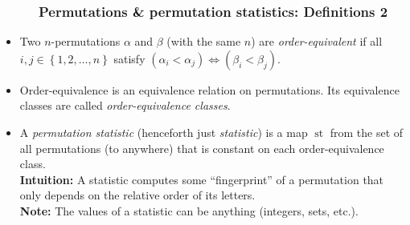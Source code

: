 \documentclass{beamer}
\newcommand{\st}{\operatorname{st}}
\newcommand{\fti}[1]{\frametitle{\ \ \ \ \ #1}}
\newcommand{\set}[1]{\left\{ #1 \right\}}
\newcommand{\tup}[1]{\left( #1 \right)}
\newcommand{\defn}[1]{{\color{darkred}\emph{#1}}} %
\theoremstyle{plain}
\begin{document}
\begin{frame}
\fti{Permutations \& permutation statistics: Definitions 2}

\begin{itemize}

\item Two $n$-permutations $\alpha$ and $\beta$ (with the same $n$)
      are \defn{order-equivalent} if all $i, j \in \set{1, 2, \ldots, n}$
      satisfy $\tup{\alpha_i < \alpha_j} \Longleftrightarrow
      \tup{\beta_i < \beta_j}$.

\item Order-equivalence is an equivalence relation on permutations.
      Its equivalence classes are called \defn{order-equivalence
      classes}.

\pause

\item A \defn{permutation statistic} (henceforth just \defn{statistic})
      is a map $\st$ from the set
      of all permutations (to anywhere) that is constant on each
      order-equivalence class. \\
      \textbf{Intuition:} A statistic computes some ``fingerprint''
      of a permutation that only depends on the relative order of its
      letters. \pause \\
      \textbf{Note:} The values of a statistic can be anything
      (integers, sets, etc.).

\end{itemize}
\end{frame}
\end{document}
